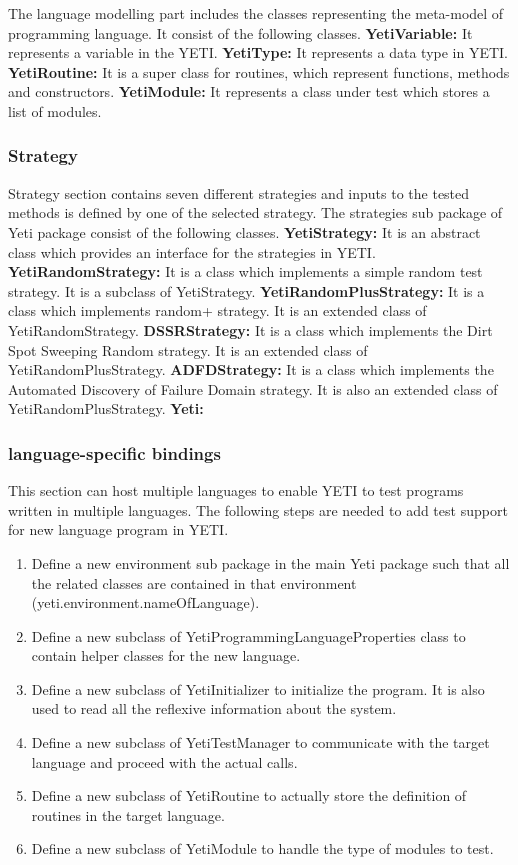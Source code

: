 The language modelling part includes the classes representing the meta-model of programming language. It consist of the following classes.
{\textbf{YetiVariable:}} It represents a variable in the YETI.
{\textbf{YetiType:}} It represents a data type in YETI.
{\textbf{YetiRoutine:}} It is a super class for routines, which represent functions, methods and constructors.
{\textbf{YetiModule:}} It represents a class under test which stores a list of modules.

\subsubsection{Strategy}
Strategy section contains seven different strategies and inputs to the tested methods is defined by one of the selected strategy. The strategies sub package of Yeti package consist of the following classes.
{\textbf{YetiStrategy:}} It is an abstract class which provides an interface for the strategies in YETI.
{\textbf{YetiRandomStrategy:}} It is a class which implements a simple random test strategy. It is a subclass of YetiStrategy.
{\textbf{YetiRandomPlusStrategy:}} It is a class which implements random+ strategy. It is an extended class of YetiRandomStrategy.
{\textbf{DSSRStrategy:}} It is a class which implements the Dirt Spot Sweeping Random strategy. It is an extended class of YetiRandomPlusStrategy.
{\textbf{ADFDStrategy:}} It is a class which implements the Automated Discovery of Failure Domain strategy. It is also an extended class of YetiRandomPlusStrategy.
{\textbf{Yeti:}}
\subsubsection{language-specific bindings}
This section can host multiple languages to enable YETI to test programs written in multiple languages. The following steps are needed to add test support for new language program in YETI. 

\begin{enumerate}
\item Define a new environment sub package in the main Yeti package such that all the related classes are contained in that environment (yeti.environment.nameOfLanguage).
\item Define a new subclass of YetiProgrammingLanguageProperties class to contain helper classes for the new language.
\item Define a new subclass of YetiInitializer to initialize the program. It is also used to read all the reflexive information about the system.
\item Define a new subclass of YetiTestManager to communicate with the target language and proceed with the actual calls.
\item Define a new subclass of YetiRoutine to actually store the definition of routines in the target language.
\item Define a new subclass of YetiModule to handle the type of modules to test.
\end{enumerate}

